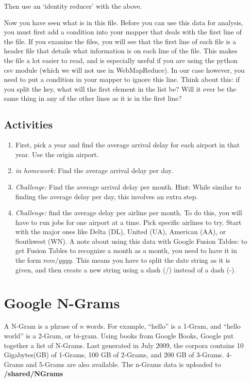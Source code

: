\documentclass[letterpaper,10pt,openany,oneside]{sphinxmanual}
\begin{document}
Then use an `identity reducer' with the above.

Now you have seen what is in this file. Before you can use this
data for analysis, you must first add a condition into your mapper
that deals with the first line of the file. If you examine the
files, you will see that the first line of each file is a header
file that details what information is on each line of the file.
This makes the file a lot easier to read, and is especially useful
if you are using the python csv module (which we will not use in
WebMapReduce). In our case however, you need to put a condition in
your mapper to ignore this line. Think about this: if you split the
key, what will the first element in the list be? Will it ever be
the same thing in any of the other lines as it is in the first
line?


\subsection{Activities}
\label{WmrActivities/WmrActivities:id3}\begin{enumerate}
\item {} 
First, pick a year and find the average arrival delay for each
airport in that year. Use the origin airport.

\item {} 
\emph{in homework:} Find the average arrival delay per day.

\item {} 
\emph{Challenge:} Find the average arrival delay per month. Hint:
While similar to finding the average delay per day, this involves
an extra step.

\item {} 
\emph{Challenge:} find the average delay per airline per month. To do
this, you will have to run jobs for one airport at a time. Pick
specific airlines to try. Start with the major ones like Delta
(DL), United (UA), American (AA), or Southwest (WN). A note about
using this data with Google Fusion Tables: to get Fusion Tables to
recognize a month as a month, you need to have it in the form
$mm/yyyy$. This means you have to split the date string as
it is given, and then create a new string using a slash (/) instead
of a dash (-).

\end{enumerate}


\section{Google N-Grams}
\label{WmrActivities/WmrActivities:google-n-grams}
A N-Gram is a phrase of $n$ words. For example, ``hello'' is
a 1-Gram, and ``hello world'' is a 2-Gram, or bi-gram. Using books
from Google Books, Google put together a list of N-Grams. Last
generated in July 2009, the corpora contains 10 Gigabytes(GB) of
1-Grams, 100 GB of 2-Grams, and 200 GB of 3-Grams. 4-Grams and
5-Grams are also available. The n-Grams data is uploaded to \textbf{/shared/NGrams}
\end{document}
